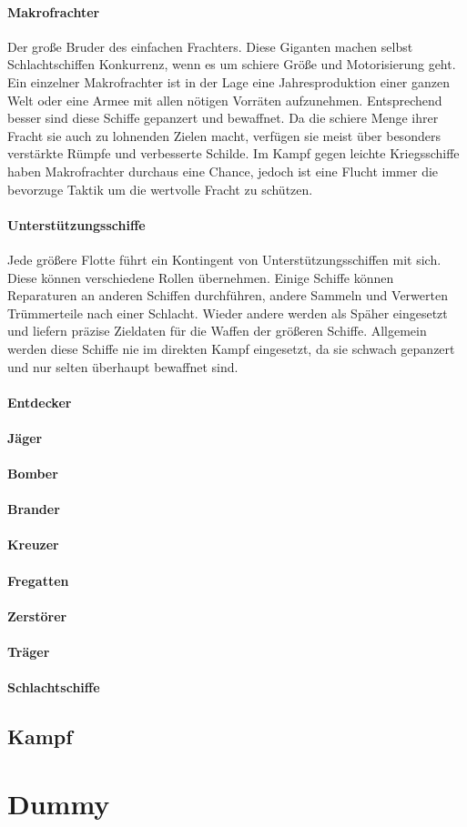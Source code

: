 \documentclass[11pt, a4paper]{article}
\begin{document}
\paragraph{Makrofrachter}
Der große Bruder des einfachen Frachters. Diese Giganten machen selbst Schlachtschiffen Konkurrenz, wenn es um
schiere Größe und Motorisierung geht. Ein einzelner Makrofrachter ist in der Lage eine Jahresproduktion einer
ganzen Welt oder eine Armee mit allen nötigen Vorräten aufzunehmen. Entsprechend besser sind diese Schiffe
gepanzert und bewaffnet. Da die schiere Menge ihrer Fracht sie auch zu lohnenden Zielen macht, verfügen sie
meist über besonders verstärkte Rümpfe und verbesserte Schilde. Im Kampf gegen leichte Kriegsschiffe haben
Makrofrachter durchaus eine Chance, jedoch ist eine Flucht immer die bevorzuge Taktik um die wertvolle Fracht
zu schützen.
%
\paragraph{Unterstützungsschiffe}
Jede größere Flotte führt ein Kontingent von Unterstützungsschiffen mit sich. Diese können verschiedene Rollen
übernehmen. Einige Schiffe können Reparaturen an anderen Schiffen durchführen, andere Sammeln und Verwerten
Trümmerteile nach einer Schlacht. Wieder andere werden als Späher eingesetzt und liefern präzise Zieldaten
für die Waffen der größeren Schiffe. Allgemein werden diese Schiffe nie im direkten Kampf eingesetzt, da sie
schwach gepanzert und nur selten überhaupt bewaffnet sind.
%
\paragraph{Entdecker}
%
\paragraph{Jäger}
%
\paragraph{Bomber}
%
\paragraph{Brander}
%
\paragraph{Kreuzer}
%
\paragraph{Fregatten}
%
\paragraph{Zerstörer}
%
\paragraph{Träger}
%
\paragraph{Schlachtschiffe}
%
\subsection{Kampf}
%
\section{Dummy}
\end{document}
